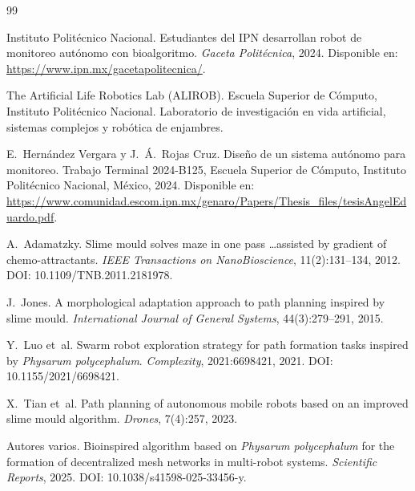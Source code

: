 \documentclass[12pt,a4paper]{article}
\begin{document}
\begin{thebibliography}{99}

Instituto Politécnico Nacional.
\newblock Estudiantes del IPN desarrollan robot de monitoreo autónomo con bioalgoritmo.
\newblock \emph{Gaceta Politécnica}, 2024.
\newblock Disponible en: \url{https://www.ipn.mx/gacetapolitecnica/}.

The Artificial Life Robotics Lab (ALIROB).
\newblock Escuela Superior de Cómputo, Instituto Politécnico Nacional.
\newblock Laboratorio de investigación en vida artificial, sistemas complejos y robótica de enjambres.

E.~Hernández Vergara y J.~Á.~Rojas Cruz.
\newblock Diseño de un sistema autónomo para monitoreo.
\newblock Trabajo Terminal 2024-B125, Escuela Superior de Cómputo, Instituto Politécnico Nacional, México, 2024.
\newblock Disponible en: \url{https://www.comunidad.escom.ipn.mx/genaro/Papers/Thesis_files/tesisAngelEduardo.pdf}.

A.~Adamatzky.
\newblock Slime mould solves maze in one pass \ldots assisted by gradient of chemo-attractants.
\newblock \emph{IEEE Transactions on NanoBioscience}, 11(2):131--134, 2012.
\newblock DOI: 10.1109/TNB.2011.2181978.

J.~Jones.
\newblock A morphological adaptation approach to path planning inspired by slime mould.
\newblock \emph{International Journal of General Systems}, 44(3):279--291, 2015.

Y.~Luo et~al.
\newblock Swarm robot exploration strategy for path formation tasks inspired by \emph{Physarum polycephalum}.
\newblock \emph{Complexity}, 2021:6698421, 2021.
\newblock DOI: 10.1155/2021/6698421.

X.~Tian et~al.
\newblock Path planning of autonomous mobile robots based on an improved slime mould algorithm.
\newblock \emph{Drones}, 7(4):257, 2023.

Autores varios.
\newblock Bioinspired algorithm based on \emph{Physarum polycephalum} for the formation of decentralized mesh networks in multi-robot systems.
\newblock \emph{Scientific Reports}, 2025.
\newblock DOI: 10.1038/s41598-025-33456-y.

\end{thebibliography}
\end{document}
